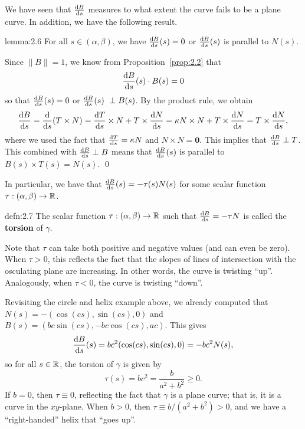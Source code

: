 We have seen that $\frac{{\rm d}B}{{\rm d}s}$ measures to what extent the curve 
fails to be a plane curve. In addition, we have the following result. 

\begin{lemma}{lemma:2.6}
    For all $s \in (\alpha, \beta)$, we have $\frac{{\rm d}B}{{\rm d}s}(s) = 0$ 
    or $\frac{{\rm d}B}{{\rm d}s}(s)$ is parallel to $N(s)$.
\end{lemma}\vspace{-0.25cm}
\begin{pf}
    Since $\|B\| = 1$, we know from Proposition~\ref{prop:2.2} that 
    \[ \frac{{\rm d}B}{{\rm d}s}(s) \cdot B(s) = 0 \] 
    so that $\frac{{\rm d}B}{{\rm d}s}(s) = 0$ or $\frac{{\rm d}B}{{\rm d}s}(s) \
    \perp B(s)$. By the product rule, we obtain 
    \begin{align*}
        \frac{{\rm d}B}{{\rm d}s} = \frac{{\rm d}}{{\rm d}s}(T \times N) 
        = \frac{{\rm d}T}{{\rm d}s} \times N + T \times \frac{{\rm d}N}{{\rm d}s}
        = \kappa N \times N + T \times \frac{{\rm d}N}{{\rm d}s}
        = T \times \frac{{\rm d}N}{{\rm d}s}, 
    \end{align*}
    where we used the fact that $\frac{{\rm d}T}{{\rm d}s} = \kappa N$ 
    and $N \times N = \mathbf 0$. This implies that 
    $\frac{{\rm d}B}{{\rm d}s} \perp T$. This combined with 
    $\frac{{\rm d}B}{{\rm d}s} \perp B$ means that 
    $\frac{{\rm d}B}{{\rm d}s}(s)$ is parallel to $B(s) \times T(s) = N(s)$. \qed 
\end{pf}\vspace{-0.25cm}

In particular, we have that $\frac{{\rm d}B}{{\rm d}s}(s) = -\tau(s)N(s)$ 
for some scalar function $\tau : (\alpha, \beta) \to \mathbb{R}$. 

\begin{defn}{defn:2.7}
    The scalar function $\tau : (\alpha, \beta) \to \mathbb{R}$ such that 
    $\frac{{\rm d}B}{{\rm d}s} = -\tau N$
    is called the {\bf torsion} of $\gamma$. 
\end{defn}\vspace{-0.25cm}
Note that $\tau$ can take both positive and negative values (and can 
even be zero). When $\tau > 0$, this reflects the fact that the slopes 
of lines of intersection with the osculating plane are increasing. 
In other words, the curve is twisting ``up''. Analogously, 
when $\tau < 0$, the curve is twisting ``down''. 

Revisiting the circle and helix example above, we already computed that 
$N(s) = -(\cos(cs), \sin(cs), 0)$ and $B(s) = 
(bc\sin(cs), -bc\cos(cs), ac)$. This gives 
\[ \frac{{\rm d}B}{{\rm d}s}(s) = bc^2(\cos(cs), \sin(cs), 0) = -bc^2 N(s), \] 
so for all $s \in \mathbb{R}$, the torsion of $\gamma$ is given by 
\[ \tau(s) = bc^2 = \frac{b}{a^2+b^2} \geq 0. \]
If $b = 0$, then $\tau \equiv 0$, reflecting the fact that $\gamma$ is a 
plane curve; that is, it is a curve in the $xy$-plane. When $b > 0$, 
then $\tau \equiv b/(a^2 + b^2) > 0$, and we have a ``right-handed'' helix 
that ``goes up''.